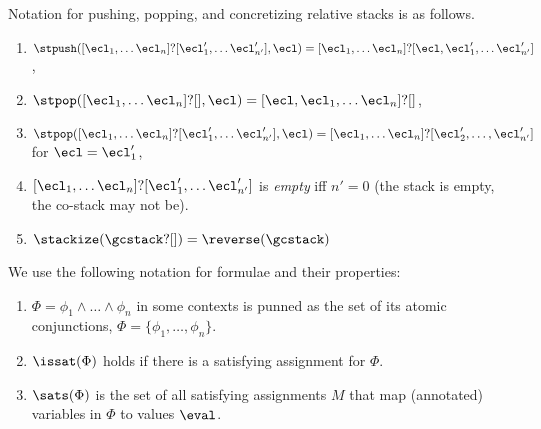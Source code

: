 \begin{definition}
  \label{def_relstacks}
  Notation for pushing, popping, and concretizing relative stacks is as follows.
\begin{enumerate}
\item
  $\stpush([\ecl_1, \dots \ecl_n] ? [\ecl'_1, \dots \ecl'_{n'}], \ecl) =
  [\ecl_1, \dots \ecl_n] ? [\ecl, \ecl'_1, \dots \ecl'_{n'}]$,
\item
  $\stpop([\ecl_1, \dots \ecl_n] ? [],\ecl) =
  [\ecl,\ecl_1, \dots \ecl_n] ? []$,
\item
  $\stpop([\ecl_1, \dots \ecl_n] ? [\ecl'_1, \dots \ecl'_{n'}],\ecl) =
  [\ecl_1, \dots \ecl_n] ? [\ecl'_2, \dots , \ecl'_{n'}]$ for $\ecl =
  \ecl'_1$,
\item $[\ecl_1, \dots \ecl_n] ? [\ecl'_1, \dots \ecl'_{n'}]$ is \emph{empty} iff $n'=0$ (the stack is empty, the co-stack may not be).
\item $\stackize(\gcstack ? []) = \reverse(\gcstack)$
\end{enumerate}
\end{definition}

\begin{definition}
  We  use the following notation for formulae and their properties:
\begin{enumerate}
    \item $\Phi = \phi_1 \land \dots \land \phi_n$ in some contexts is punned as the set of its atomic conjunctions, $\Phi = \{\phi_1,\ldots,\phi_n\}$.
    \item $\issat(\Phi)$ holds if there is a satisfying assignment for $\Phi$.
    \item $\sats(\Phi)$ is the set of all satisfying assignments $M$ that map (annotated) variables in $\Phi$ to values $\eval$.
\end{enumerate}
\end{definition}

